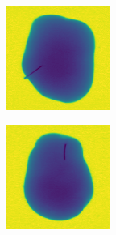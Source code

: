 \documentclass[11pt]{article}
\begin{document}
\begin{figure}[!h]
\begin{subfigure}[b]{0.22\textwidth}
         \caption{}
         \label{fig:metal_31}
     \end{subfigure}
          \\
    \begin{subfigure}[b]{0.22\textwidth}
         \centering
         \includegraphics[width=\textwidth]{figurer/potato_dataset/metal/metal_32.jpg}
         \caption{}
         \label{fig:metal_32}
     \end{subfigure}
     \hfill
     \begin{subfigure}[b]{0.22\textwidth}
         \centering
         \includegraphics[width=\textwidth]{figurer/potato_dataset/metal/metal_33.jpg}

\end{subfigure}
\end{figure}
\end{document}
